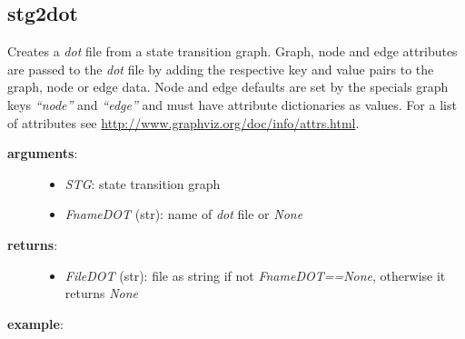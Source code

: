 \documentclass[letterpaper,10pt,english]{sphinxmanual}
\begin{document}
\subsection{stg2dot}
\label{StateTransitionGraphs:stg2dot}\label{StateTransitionGraphs:id17}

\begin{fulllineitems}
\label{StateTransitionGraphs:PyBoolNet.StateTransitionGraphs.stg2dot}
Creates a \emph{dot} file from a state transition graph.
Graph, node and edge attributes are passed to the \emph{dot} file by adding the respective key and value pairs to the graph, node or edge data.
Node and edge defaults are set by the specials graph keys \emph{``node''} and \emph{``edge''} and must have attribute dictionaries as values.
For a list of attributes see \href{http://www.graphviz.org/doc/info/attrs.html}{http://www.graphviz.org/doc/info/attrs.html}.
\begin{description}
\item[{\textbf{arguments}:}] \leavevmode\begin{itemize}
\item {} 
\emph{STG}: state transition graph

\item {} 
\emph{FnameDOT} (str): name of \emph{dot} file or \emph{None}

\end{itemize}

\item[{\textbf{returns}:}] \leavevmode\begin{itemize}
\item {} 
\emph{FileDOT} (str): file as string if not \emph{FnameDOT==None}, otherwise it returns \emph{None}

\end{itemize}

\end{description}

\textbf{example}:


\end{fulllineitems}
\end{document}
